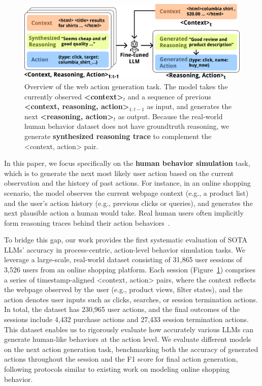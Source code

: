 \documentclass[11pt]{article}
\begin{document}
\begin{figure}[t]
    \centering
    \includegraphics[width=\linewidth]{figures/teaser.pdf}
\caption{Overview of the web action generation task. The model takes the currently observed \textbf{<context>$_{t}$} and a sequence of previous \textbf{<context, reasoning, action>$_{1:t-1}$} as input, and generates the next \textbf{<reasoning, action>$_{t}$} as output. Because the real-world human behavior dataset does not have groundtruth reasoning, we generate \textbf{synthesized reasoning trace} to complement the <context, action> pair. }
    \label{fig:model-arch}
    \vspace{-\baselineskip}
\end{figure}

In this paper, we focus specifically on the \textbf{human behavior simulation} task, which is to generate the next most likely user action based on the current observation and the history of past actions. For instance, in an online shopping scenario, the model observes the current webpage context (e.g., a product list) and the user’s action history (e.g., previous clicks or queries), and generates the next plausible action a human would take.
Real human users often implicitly form reasoning traces behind their action behaviors~\cite{caoThinkingFastSlow2023}. 


To bridge this gap, our work provides the first systematic evaluation of SOTA LLMs' accuracy in process-centric, action-level behavior simulation tasks.
We leverage a large-scale, real-world dataset consisting of 31,865 user sessions of 3,526 users from an online shopping platform.
Each session (Figure~\ref{fig:model-arch}) comprises a series of timestamp-aligned <context, action> pairs, where the context reflects the webpage observed by the user (e.g., product views, filter states), and the action denotes user inputs such as clicks, searches, or session termination actions.
In total, the dataset has 230,965 user actions, and the final outcomes of the sessions include 4,432 purchase actions and 27,433 session termination actions.
This dataset enables us to rigorously evaluate how accurately various LLMs can generate human-like behaviors at the action level.
We evaluate different models on the next action generation task, benchmarking both the accuracy of generated actions throughout the session and the F1 score for final action generation, following protocols similar to existing work on modeling online shopping behavior.
\end{document}
